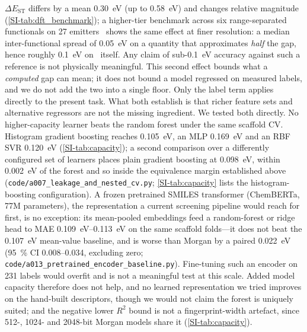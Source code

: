 $\Delta E_\text{ST}$ differs by a mean \qty{0.30}{\electronvolt} (up to
\qty{0.58}{\electronvolt}) and changes
relative magnitude (\cref{SI-tab:dft_benchmark}); a higher-tier benchmark across
six range-separated functionals on \num{27} emitters~\cite{Froitzheim2024} shows the same
effect at finer resolution: a median inter-functional spread of \qty{0.05}{\electronvolt}
on a quantity that approximates \emph{half} the gap, hence roughly
\qty{0.1}{\electronvolt} on \deltaest\ itself. Any claim of sub-\qty{0.1}{\electronvolt}
accuracy against such a reference is not physically meaningful. This second effect bounds
what a \emph{computed} gap can mean; it does not bound a model regressed on measured
labels, and we do not add the two into a single floor. Only the label term applies
directly to the present task. What both establish is that richer feature sets and
alternative regressors are not the missing ingredient. We tested both directly. No higher-capacity learner beats the
random forest under the same scaffold CV. Histogram gradient boosting reaches
\qty{0.105}{\electronvolt}, an MLP \qty{0.169}{\electronvolt} and an RBF SVR
\qty{0.120}{\electronvolt} (\cref{SI-tab:capacity}); a second comparison over a
differently configured set of learners places plain gradient boosting at
\qty{0.098}{\electronvolt}, within \qty{0.002}{\electronvolt} of the forest and so
inside the equivalence margin established above
(\texttt{code/a007\_leakage\_and\_nested\_cv.py}; \cref{SI-tab:capacity} lists the
histogram-boosting configuration). A frozen pretrained SMILES transformer (ChemBERTa,
\num{77}M parameters), the representation a current screening pipeline would reach for
first, is no exception: its mean-pooled embeddings feed a random-forest or ridge head
to MAE \qtyrange{0.109}{0.113}{\electronvolt} on the same scaffold folds---it does not
beat the \qty{0.107}{\electronvolt} mean-value baseline, and is worse than Morgan by a
paired \qty{0.022}{\electronvolt} (\qty{95}{\percent} CI \numrange{0.008}{0.034},
excluding zero; \texttt{code/a013\_pretrained\_encoder\_baseline.py}). Fine-tuning such an
encoder on \num{231} labels would overfit and is not a meaningful test at this scale.
Added model capacity therefore does not help, and no learned representation we tried
improves on the hand-built descriptors, though we would not claim the forest is
uniquely suited; and the negative lower $R^2$ bound is not a
fingerprint-width artefact, since \num{512}-, \num{1024}- and \num{2048}-bit Morgan models
share it (\cref{SI-tab:capacity}).

